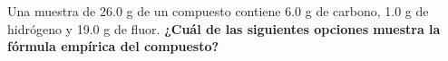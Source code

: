 Una muestra de 26.0 g de un compuesto contiene 6.0 g de carbono, 1.0 g de hidrógeno y 19.0 g de fluor.
\textbf{¿Cuál de las siguientes opciones muestra la fórmula empírica del compuesto?}

\begin{choices}
    \choice  {}
    \choice  {}
    \choice  {}
    \choice  {}
\end{choices}